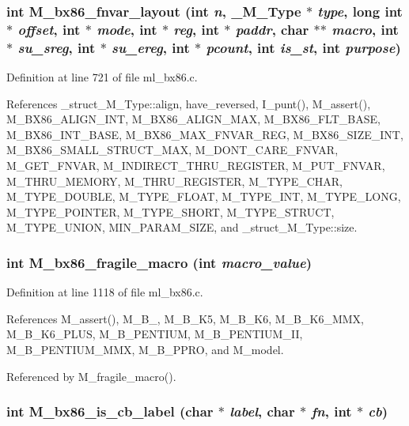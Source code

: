 \subsubsection{\setlength{\rightskip}{0pt plus 5cm}int M\_\-bx86\_\-fnvar\_\-layout (int {\em n}, \bf{\_\-M\_\-Type} $\ast$ {\em type}, long int $\ast$ {\em offset}, int $\ast$ {\em mode}, int $\ast$ {\em reg}, int $\ast$ {\em paddr}, char $\ast$$\ast$ {\em macro}, int $\ast$ {\em su\_\-sreg}, int $\ast$ {\em su\_\-ereg}, int $\ast$ {\em pcount}, int {\em is\_\-st}, int {\em purpose})}\label{ml__bx86_8c_ec6b6d6e2f94ff9c63ee392829f32504}




Definition at line 721 of file ml\_\-bx86.c.

References \_\-struct\_\-M\_\-Type::align, have\_\-reversed, I\_\-punt(), M\_\-assert(), M\_\-BX86\_\-ALIGN\_\-INT, M\_\-BX86\_\-ALIGN\_\-MAX, M\_\-BX86\_\-FLT\_\-BASE, M\_\-BX86\_\-INT\_\-BASE, M\_\-BX86\_\-MAX\_\-FNVAR\_\-REG, M\_\-BX86\_\-SIZE\_\-INT, M\_\-BX86\_\-SMALL\_\-STRUCT\_\-MAX, M\_\-DONT\_\-CARE\_\-FNVAR, M\_\-GET\_\-FNVAR, M\_\-INDIRECT\_\-THRU\_\-REGISTER, M\_\-PUT\_\-FNVAR, M\_\-THRU\_\-MEMORY, M\_\-THRU\_\-REGISTER, M\_\-TYPE\_\-CHAR, M\_\-TYPE\_\-DOUBLE, M\_\-TYPE\_\-FLOAT, M\_\-TYPE\_\-INT, M\_\-TYPE\_\-LONG, M\_\-TYPE\_\-POINTER, M\_\-TYPE\_\-SHORT, M\_\-TYPE\_\-STRUCT, M\_\-TYPE\_\-UNION, MIN\_\-PARAM\_\-SIZE, and \_\-struct\_\-M\_\-Type::size.
\subsubsection{\setlength{\rightskip}{0pt plus 5cm}int M\_\-bx86\_\-fragile\_\-macro (int {\em macro\_\-value})}\label{ml__bx86_8c_e9dad53ec18df549a23857a02956788c}




Definition at line 1118 of file ml\_\-bx86.c.

References M\_\-assert(), M\_\-B\_, M\_\-B\_\-K5, M\_\-B\_\-K6, M\_\-B\_\-K6\_\-MMX, M\_\-B\_\-K6\_\-PLUS, M\_\-B\_\-PENTIUM, M\_\-B\_\-PENTIUM\_\-II, M\_\-B\_\-PENTIUM\_\-MMX, M\_\-B\_\-PPRO, and M\_\-model.

Referenced by M\_\-fragile\_\-macro().
\subsubsection{\setlength{\rightskip}{0pt plus 5cm}int M\_\-bx86\_\-is\_\-cb\_\-label (char $\ast$ {\em label}, char $\ast$ {\em fn}, int $\ast$ {\em cb})}\label{ml__bx86_8c_f73c81af020b2cc019475a9d715b448b}




